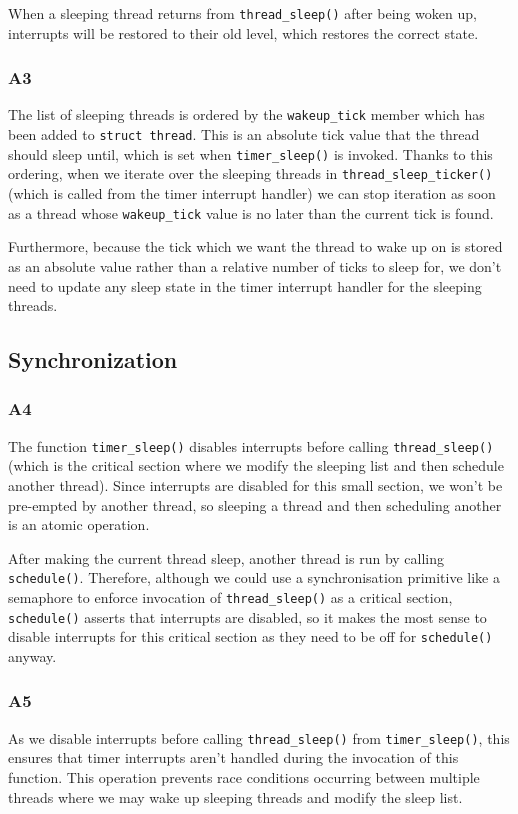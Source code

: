 \documentclass[a4wide, 11pt]{article}
\newcommand{\tx}{\texttt}
\begin{document}
When a sleeping thread returns from \texttt{thread\_sleep()} after being woken up, interrupts will be restored to their old level, which restores the correct state.

\subsubsection{A3}

The list of sleeping threads is ordered by the \tx{wakeup\_tick} member
which has been added to \tx{struct thread}. This is an absolute tick value that the thread 
should sleep until, which is set when \tx{timer\_sleep()} is invoked. Thanks to this ordering, when we iterate over the sleeping threads in \tx{thread\_sleep\_ticker()} (which is called from the
timer interrupt handler) we can stop iteration as soon as a thread whose \tx{wakeup\_tick} value is no later than the current tick is found.

Furthermore, because the tick which we want the thread to wake up on is stored as
an absolute value rather than a relative number of ticks to sleep for, we don't
need to update any sleep state in the timer interrupt handler for the sleeping
threads.

\subsection{Synchronization}
\subsubsection{A4}
The function \tx{timer\_sleep()} disables interrupts before calling \tx{thread\_sleep()} (which is the critical section where we modify the sleeping list and then schedule 
another thread). Since interrupts are disabled for this small section, we won't 
be pre-empted by another thread, so sleeping a thread and then scheduling 
another is an atomic operation.

After making the current thread sleep, another thread is run by calling \tx{schedule()}. Therefore, although we could use a synchronisation primitive like a semaphore to enforce invocation of \tx{thread\_sleep()} as a critical section, \tx{schedule()} asserts that interrupts are disabled, so it makes the most sense to disable interrupts for this critical section as they need to be off for \tx{schedule()} anyway.

\subsubsection{A5}
As we disable interrupts before calling \tx{thread\_sleep()} from \tx{timer\_sleep()}, this ensures that timer interrupts aren't handled during the invocation of this function. This operation prevents race conditions occurring between multiple threads where
we may wake up sleeping threads and modify the sleep list.
\end{document}
